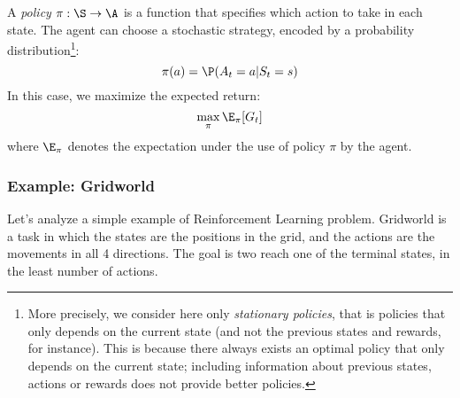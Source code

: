 \begin{definition}[Policy]
    A \emph{policy} $\pi:\S\to\A$ is a function that specifies which action to take in each state. The agent can choose a stochastic strategy, encoded by a probability distribution\footnote{More precisely, we consider here only \emph{stationary policies}, that is policies that only depends on the current state (and not the previous states and rewards, for instance). This is because there always exists an optimal policy that only depends on the current state; including information about previous states, actions or rewards does not provide better policies.}:
    \begin{equation*}
        \pi(a)=\P(A_t=a|S_t=s)
    \end{equation*}
    In this case, we maximize the expected return:
    \begin{equation*}
        \max_\pi\E_\pi[G_t]
    \end{equation*}
    where $\E_\pi$ denotes the expectation under the use of policy $\pi$ by the agent.
\end{definition}


\subsubsection{Example: Gridworld}
Let's analyze a simple example of Reinforcement Learning problem. Gridworld is a task in which the states are the positions in the grid, and the actions are the movements in all 4 directions. The goal is two reach one of the terminal states, in the least number of actions.

